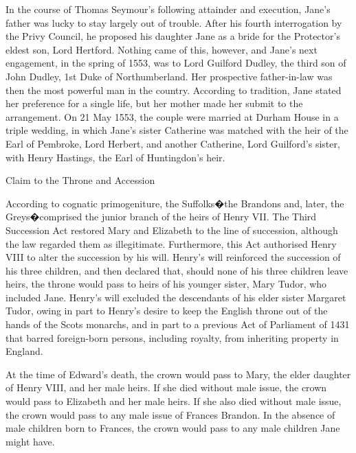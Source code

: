 \documentclass{article}
\begin{document}
In the course of Thomas Seymour's following attainder and execution, Jane's father was lucky to stay largely out of trouble. After his fourth interrogation by the Privy Council, he proposed his daughter Jane as a bride for the Protector's eldest son, Lord Hertford. Nothing came of this, however, and Jane's next engagement, in the spring of 1553, was to Lord Guilford Dudley, the third son of John Dudley, 1st Duke of Northumberland. Her prospective father-in-law was then the most powerful man in the country. According to tradition, Jane stated her preference for a single life, but her mother made her submit to the arrangement. On 21 May 1553, the couple were married at Durham House in a triple wedding, in which Jane's sister Catherine was matched with the heir of the Earl of Pembroke, Lord Herbert, and another Catherine, Lord Guilford's sister, with Henry Hastings, the Earl of Huntingdon's heir.


Claim to the Throne and Accession

According to cognatic primogeniture, the Suffolks�the Brandons and, later, the Greys�comprised the junior branch of the heirs of Henry VII. The Third Succession Act restored Mary and Elizabeth to the line of succession, although the law regarded them as illegitimate. Furthermore, this Act authorised Henry VIII to alter the succession by his will. Henry's will reinforced the succession of his three children, and then declared that, should none of his three children leave heirs, the throne would pass to heirs of his younger sister, Mary Tudor, who included Jane. Henry's will excluded the descendants of his elder sister Margaret Tudor, owing in part to Henry's desire to keep the English throne out of the hands of the Scots monarchs, and in part to a previous Act of Parliament of 1431 that barred foreign-born persons, including royalty, from inheriting property in England.

At the time of Edward's death, the crown would pass to Mary, the elder daughter of Henry VIII, and her male heirs. If she died without male issue, the crown would pass to Elizabeth and her male heirs. If she also died without male issue, the crown would pass to any male issue of Frances Brandon. In the absence of male children born to Frances, the crown would pass to any male children Jane might have.
\end{document}
